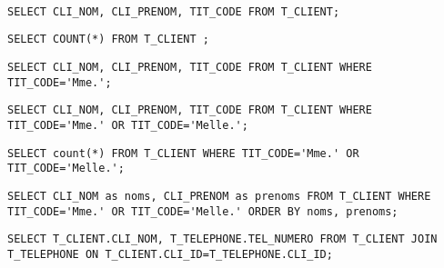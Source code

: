 \exer{[hotel]}
\setcounter{numques}{0}~\\




\begin{lstlisting}
SELECT CLI_NOM, CLI_PRENOM, TIT_CODE FROM T_CLIENT;
\end{lstlisting}


\begin{lstlisting}
SELECT COUNT(*) FROM T_CLIENT ;
\end{lstlisting}



\begin{lstlisting}
SELECT CLI_NOM, CLI_PRENOM, TIT_CODE FROM T_CLIENT WHERE TIT_CODE='Mme.';
\end{lstlisting}


\begin{lstlisting}
SELECT CLI_NOM, CLI_PRENOM, TIT_CODE FROM T_CLIENT WHERE TIT_CODE='Mme.' OR TIT_CODE='Melle.';
\end{lstlisting}


\begin{lstlisting}
SELECT count(*) FROM T_CLIENT WHERE TIT_CODE='Mme.' OR TIT_CODE='Melle.';
\end{lstlisting}


\begin{lstlisting}
SELECT CLI_NOM as noms, CLI_PRENOM as prenoms FROM T_CLIENT WHERE TIT_CODE='Mme.' OR TIT_CODE='Melle.' ORDER BY noms, prenoms;
\end{lstlisting}


\begin{lstlisting}
SELECT T_CLIENT.CLI_NOM, T_TELEPHONE.TEL_NUMERO FROM T_CLIENT JOIN T_TELEPHONE ON T_CLIENT.CLI_ID=T_TELEPHONE.CLI_ID;
\end{lstlisting}

